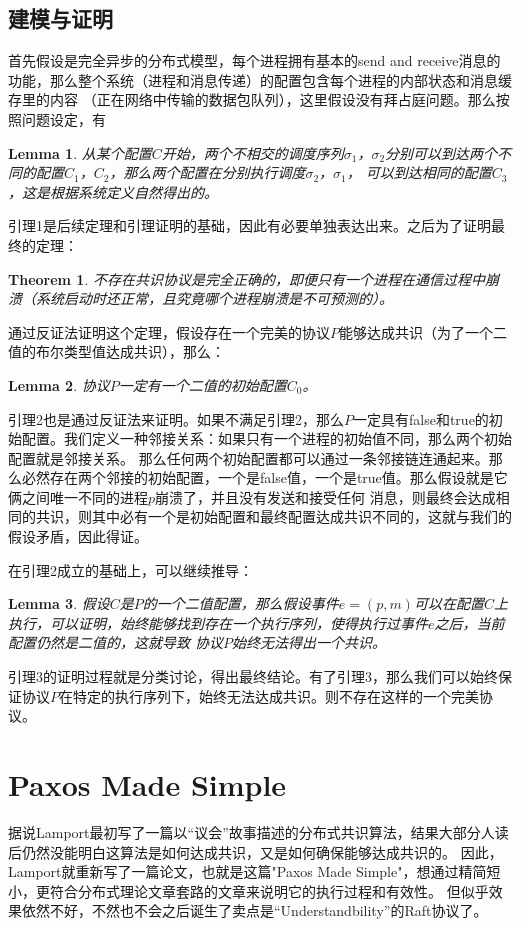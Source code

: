 \documentclass[UTF8]{article}
\newtheorem{theorem}{Theorem}
\newtheorem{lemma}{Lemma}
\begin{document}
\subsection{建模与证明}
首先假设是完全异步的分布式模型，每个进程拥有基本的send and receive消息的功能，那么整个系统（进程和消息传递）的配置包含每个进程的内部状态和消息缓存里的内容
（正在网络中传输的数据包队列），这里假设没有拜占庭问题。那么按照问题设定，有
\begin{lemma}
    从某个配置$C$开始，两个不相交的调度序列$\sigma _1$，$\sigma_2$分别可以到达两个不同的配置$C_1$，$C_2$，那么两个配置在分别执行调度$\sigma_2$，$\sigma_1$，
    可以到达相同的配置$C_3$，这是根据系统定义自然得出的。
\end{lemma}
引理1是后续定理和引理证明的基础，因此有必要单独表达出来。之后为了证明最终的定理：
\begin{theorem}
    不存在共识协议是完全正确的，即便只有一个进程在通信过程中崩溃（系统启动时还正常，且究竟哪个进程崩溃是不可预测的）。
\end{theorem}
通过反证法证明这个定理，假设存在一个完美的协议$P$能够达成共识（为了一个二值的布尔类型值达成共识），那么：
\begin{lemma}
    协议$P$一定有一个二值的初始配置$C_0$。
\end{lemma}
引理2也是通过反证法来证明。如果不满足引理2，那么$P$一定具有false和true的初始配置。我们定义一种邻接关系：如果只有一个进程的初始值不同，那么两个初始配置就是邻接关系。
那么任何两个初始配置都可以通过一条邻接链连通起来。那么必然存在两个邻接的初始配置，一个是false值，一个是true值。那么假设就是它俩之间唯一不同的进程$p$崩溃了，并且没有发送和接受任何
消息，则最终会达成相同的共识，则其中必有一个是初始配置和最终配置达成共识不同的，这就与我们的假设矛盾，因此得证。

在引理2成立的基础上，可以继续推导：
\begin{lemma}
    假设$C$是$P$的一个二值配置，那么假设事件$e=(p,m)$可以在配置$C$上执行，可以证明，始终能够找到存在一个执行序列，使得执行过事件$e$之后，当前配置仍然是二值的，这就导致
    协议$P$始终无法得出一个共识。
\end{lemma}
引理3的证明过程就是分类讨论，得出最终结论。有了引理3，那么我们可以始终保证协议$P$在特定的执行序列下，始终无法达成共识。则不存在这样的一个完美协议。

\section{Paxos Made Simple}
据说Lamport最初写了一篇以“议会”故事描述的分布式共识算法，结果大部分人读后仍然没能明白这算法是如何达成共识，又是如何确保能够达成共识的。
因此，Lamport就重新写了一篇论文，也就是这篇"Paxos Made Simple"，想通过精简短小，更符合分布式理论文章套路的文章来说明它的执行过程和有效性。
但似乎效果依然不好，不然也不会之后诞生了卖点是“Understandbility”的Raft协议了。
\end{document}
